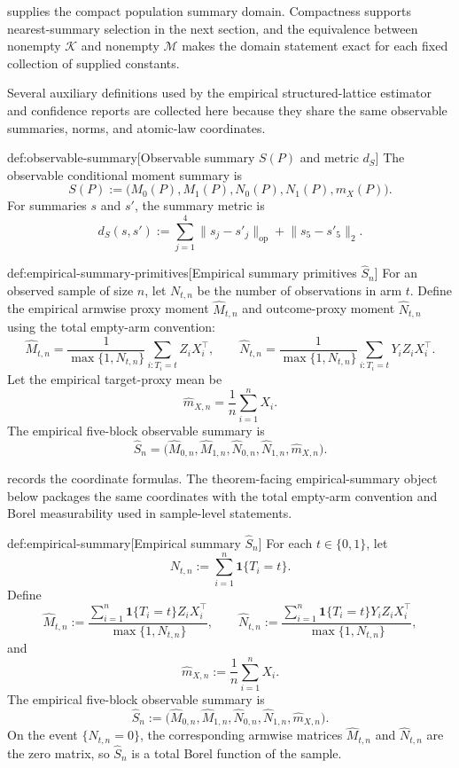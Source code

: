  supplies the compact population summary domain. Compactness supports nearest-summary selection in the next section, and the equivalence between nonempty \(\mathcal K\) and nonempty \(\mathcal M\) makes the domain statement exact for each fixed collection of supplied constants.

Several auxiliary definitions used by the empirical structured-lattice estimator and confidence reports are collected here because they share the same observable summaries, norms, and atomic-law coordinates.

\begin{definitionv}{def:observable-summary}[Observable summary \(S(P)\) and metric \(d_S\)]
The observable conditional moment summary is
\[
S(P):=\bigl(M_0(P),M_1(P),N_0(P),N_1(P),m_X(P)\bigr).
\]
For summaries \(s\) and \(s'\), the summary metric is
\[
d_S(s,s')
:=
\sum_{j=1}^{4}\lVert s_j-s'_j\rVert_{\mathrm{op}}
+\lVert s_5-s'_5\rVert_2.
\]
\end{definitionv}

\begin{definitionv}{def:empirical-summary-primitives}[Empirical summary primitives \(\widehat S_n\)]
For an observed sample of size \(n\), let \(N_{t,n}\) be the number of observations in arm \(t\). Define the empirical armwise proxy moment \(\widehat M_{t,n}\) and outcome-proxy moment \(\widehat N_{t,n}\) using the total empty-arm convention:
\[
\widehat M_{t,n}
=
\frac{1}{\max\{1,N_{t,n}\}}
\sum_{i:T_i=t} Z_iX_i^\top,
\qquad
\widehat N_{t,n}
=
\frac{1}{\max\{1,N_{t,n}\}}
\sum_{i:T_i=t} Y_iZ_iX_i^\top .
\]
Let the empirical target-proxy mean be
\[
\widehat m_{X,n}
=
\frac{1}{n}\sum_{i=1}^n X_i .
\]
The empirical five-block observable summary is
\[
\widehat S_n
=
\bigl(
\widehat M_{0,n},
\widehat M_{1,n},
\widehat N_{0,n},
\widehat N_{1,n},
\widehat m_{X,n}
\bigr).
\]
\end{definitionv}

 records the coordinate formulas. The theorem-facing empirical-summary object below packages the same coordinates with the total empty-arm convention and Borel measurability used in sample-level statements.

\begin{definitionv}{def:empirical-summary}[Empirical summary \(\widehat S_n\)]
For each \(t\in\{0,1\}\), let
\[
N_{t,n}:=\sum_{i=1}^{n}\mathbf 1\{T_i=t\}.
\]
Define
\[
\widehat M_{t,n}
:=
\frac{\sum_{i=1}^{n}\mathbf 1\{T_i=t\}Z_iX_i^\top}{\max\{1,N_{t,n}\}},
\qquad
\widehat N_{t,n}
:=
\frac{\sum_{i=1}^{n}\mathbf 1\{T_i=t\}Y_iZ_iX_i^\top}{\max\{1,N_{t,n}\}},
\]
and
\[
\widehat m_{X,n}:=\frac{1}{n}\sum_{i=1}^{n}X_i.
\]
The empirical five-block observable summary is
\[
\widehat S_n
:=
\bigl(\widehat M_{0,n},\widehat M_{1,n},
\widehat N_{0,n},\widehat N_{1,n},\widehat m_{X,n}\bigr).
\]
On the event \(\{N_{t,n}=0\}\), the corresponding armwise matrices \(\widehat M_{t,n}\) and \(\widehat N_{t,n}\) are the zero matrix, so \(\widehat S_n\) is a total Borel function of the sample.
\end{definitionv}

